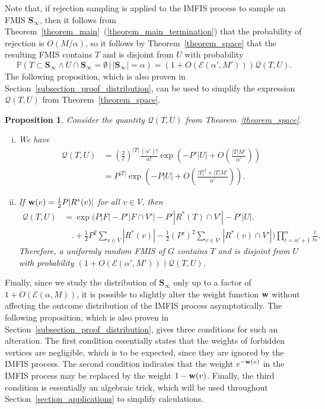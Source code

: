 \documentclass{article}
\theoremstyle{plain}
\theoremstyle{remark}
\theoremstyle{plain}
\newtheorem{proposition}[theorem]{Proposition}
\numberwithin{equation}{section}
\renewcommand{\b}{{\bf{w}}}
\begin{document}
	Note that, if rejection sampling is applied to the IMFIS process to sample an FMIS $\boldsymbol{S}_{\infty}$, then it follows from Theorem~\ref{theorem_main}~(\ref{theorem_main_termination}) that the probability of rejection is $O(M/\alpha)$, so it follows by Theorem~\ref{theorem_space} that the resulting FMIS contains $T$ and is disjoint from $U$ with probability $$\mathbb{P}(T\subset\boldsymbol{S}_{\infty}\wedge U\cap\boldsymbol{S}_{\infty}=\emptyset\,|\,|\boldsymbol{S}_{\infty}|=\alpha)=(1+O(\mathscr{E}(\alpha',M')))\mathscr{Q}(T,U).$$ The following proposition, which is also proven in Section~\ref{subsection_proof_distribution}, can be used to simplify the expression $\mathscr{Q}(T,U)$ from Theorem~\ref{theorem_space}.
	
	\begin{proposition}\label{proposition_qt}
		Consider the quantity $\mathscr{Q}(T,U)$ from Theorem~\ref{theorem_space}.
		\begin{enumerate}[(i)]
			\item\label{proposition_qt_small} We have
			\begin{align}
				\mathscr{Q}(T,U)&=\left(\frac{2}{\ell}\right)^{|T|}\frac{(\alpha')!}{\alpha!}\exp\left(-P'|U|+O\left(\frac{|T|M'}{\alpha'}\right)\right)
				\\&=P^{|T|}\exp\left(-P|U|+O\left(\frac{|T|^2+|T|M'}{\alpha'}\right)\right).
			\end{align}
			\item\label{proposition_qt_uniform} If $\b(v)=\frac12P|R^*(v)|$ for all $v\in V$, then
			\begin{align}
				\mathscr{Q}(T,U)&=\exp\Bigg(P|F|-P'|F\cap V'|-P'|R^*(T)\cap V'|-P'|U|\Bigg.
				\\&\quad\Bigg.+\tfrac12P^2\sum_{v\in V}|R^*(v)|-\tfrac12(P')^2\sum_{v\in V'}|R^*(v)\cap V'|\Bigg)\prod_{t=\alpha'+1}^{\alpha}\frac{t}{n_t}.
			\end{align}
			Therefore, a uniformly random FMIS of $G$ contains $T$ and is disjoint from $U$ with probability $(1+O(\mathscr{E}(\alpha',M')))\mathscr{Q}(T,U)$.
		\end{enumerate}
	\end{proposition}
	
	Finally, since we study the distribution of $\boldsymbol{S}_{\infty}$ only up to a factor of $1+O(\mathscr{E}(\alpha,M))$, it is possible to slightly alter the weight function $\b$ without affecting the outcome distribution of the IMFIS process asymptotically. The following proposition, which is also proven in Section~\ref{subsection_proof_distribution}, gives three conditions for such an alteration. The first condition essentially states that the weights of forbidden vertices are negligible, which is to be expected, since they are ignored by the IMFIS process. The second condition indicates that the weight $e^{-\b(v)}$ in the IMFIS process may be replaced by the weight $1-\b(v)$. Finally, the third condition is essentially an algebraic trick, which will be used throughout Section~\ref{section_applications} to simplify calculations.
	
\end{document}
